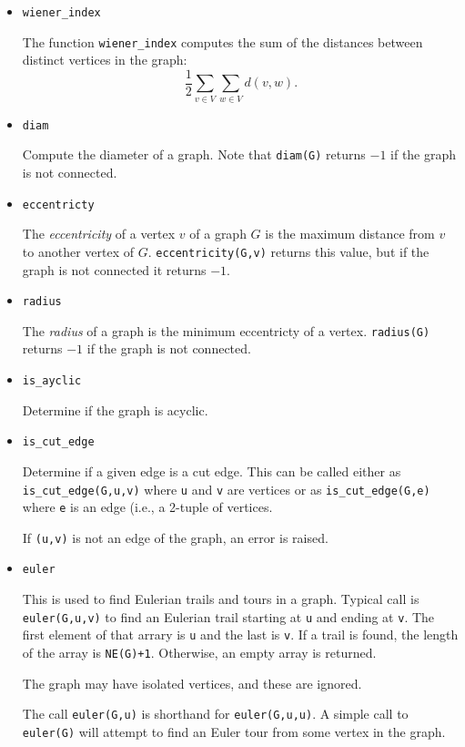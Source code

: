 \documentclass[oneside]{amsart}
\begin{document}
\begin{itemize}
\item \verb|wiener_index|

  The function \verb|wiener_index| computes the sum of the distances
  between distinct vertices in the graph:
  \[
  \frac12 \sum_{v\in V} \sum_{w \in V} d(v,w).
  \]

\item \verb|diam|

  Compute the diameter of a graph. Note that \verb|diam(G)| returns
  $-1$ if the graph is not connected.


\item \verb|eccentricty|

  The \emph{eccentricity} of a vertex $v$ of a graph $G$ is the
  maximum distance from $v$ to another vertex of $G$.
  \verb|eccentricity(G,v)| returns this
  value, but if the graph is not connected it returns $-1$.

\item \verb|radius|

  The \emph{radius} of a graph is the minimum eccentricty of a vertex.
  \verb|radius(G)| returns $-1$ if the graph is not connected.


\item \verb|is_ayclic|

  Determine if the graph is acyclic.

\item \verb|is_cut_edge|

  Determine if a given edge is a cut edge. This can be called either
  as \verb|is_cut_edge(G,u,v)| where \verb|u| and \verb|v| are
  vertices or as \verb|is_cut_edge(G,e)| where \verb|e| is an edge
  (i.e., a 2-tuple of vertices.

  If \verb|(u,v)| is not an edge of the graph, an error is raised.


\item \verb|euler|

  This is used to find Eulerian trails and tours in a graph. Typical
  call is \verb|euler(G,u,v)| to find an Eulerian trail starting at
  \verb|u| and ending at \verb|v|.  The first element of that arrary
  is \verb|u| and the last is \verb|v|. If a trail is found, the
  length of the array is \verb|NE(G)+1|. Otherwise, an empty array is
  returned.

  The graph may have isolated vertices, and these are ignored.

  The call \verb|euler(G,u)| is shorthand for \verb|euler(G,u,u)|. A
  simple call to \verb|euler(G)| will attempt to find an Euler tour
  from some vertex in the graph.


\end{itemize}
\end{document}
